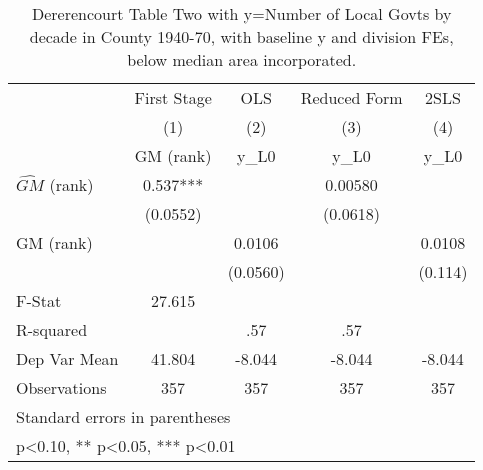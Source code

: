 \begin{table}[htbp]\centering
\def\sym#1{\ifmmode^{#1}\else\(^{#1}\)\fi}
\caption{Dererencourt Table Two with y=Number of Local Govts by decade in County 1940-70, with baseline y and division FEs, below median area incorporated.}
\begin{tabular}{l*{4}{c}}
\toprule
                    & First Stage   &         OLS   &Reduced Form   &        2SLS   \\
                    &\multicolumn{1}{c}{(1)}&\multicolumn{1}{c}{(2)}&\multicolumn{1}{c}{(3)}&\multicolumn{1}{c}{(4)}\\
                    &\multicolumn{1}{c}{GM  (rank)}&\multicolumn{1}{c}{y\_L0}&\multicolumn{1}{c}{y\_L0}&\multicolumn{1}{c}{y\_L0}\\
\midrule
$\hat{GM}$ (rank)   &       0.537***&               &     0.00580   &               \\
                    &    (0.0552)   &               &    (0.0618)   &               \\
\addlinespace
GM  (rank)          &               &      0.0106   &               &      0.0108   \\
                    &               &    (0.0560)   &               &     (0.114)   \\
\midrule
F-Stat              &      27.615   &               &               &               \\
R-squared           &               &         .57   &         .57   &               \\
Dep Var Mean        &      41.804   &      -8.044   &      -8.044   &      -8.044   \\
Observations        &         357   &         357   &         357   &         357   \\
\bottomrule
\multicolumn{5}{l}{\footnotesize Standard errors in parentheses}\\
\multicolumn{5}{l}{\footnotesize * p<0.10, ** p<0.05, *** p<0.01}\\
\end{tabular}
\end{table}
